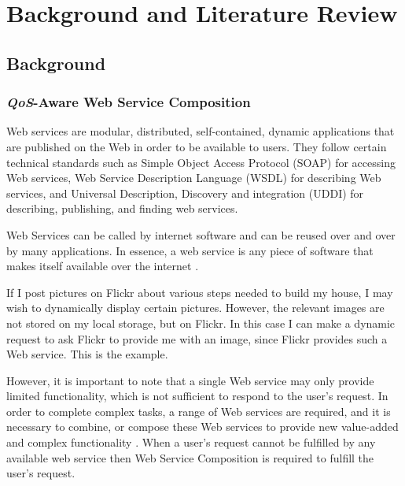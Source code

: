 \chapter{Background and Literature Review}\label{C:ex}
\section{Background}
\subsection{\emph{QoS}-Aware Web Service Composition}

Web services \cite{24} are modular, distributed, self-contained, dynamic applications that are published on the Web in order to be available to users. They follow certain technical standards such as Simple Object Access Protocol (SOAP) \cite{24} for accessing Web services, Web Service Description Language (WSDL) \cite{24} for describing Web services, and Universal Description, Discovery and integration (UDDI) \cite{25} for describing, publishing, and finding web services. \par

Web Services can be called by internet software and can be reused over and over by many applications. In essence, a web service is any piece of software that makes itself available over the internet \cite{27}.\par
\begin{exmp}
If I post pictures on Flickr about various steps needed to build my house, I may wish to dynamically display certain pictures. However, the relevant images are not stored on my local storage, but on Flickr. In this case I can make a dynamic request to ask Flickr to provide me with an image, since Flickr provides such a Web service.
This is the example.
\end{exmp}

However, it is important to note that a single Web service may only provide limited functionality, which is not sufficient to respond to the user's request. In order to complete complex tasks, a range of Web services are required, and it is necessary to combine, or compose these Web services to provide new value-added and complex functionality \cite{28}. When a user's request cannot be fulfilled by any available web service then Web Service Composition is required to fulfill the user's request.\

